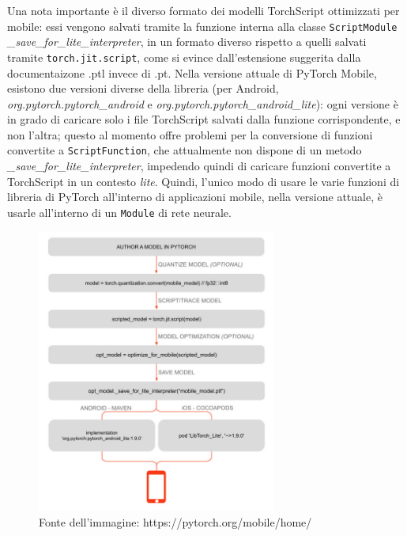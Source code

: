 Una nota importante è il diverso formato dei modelli TorchScript ottimizzati per mobile: 
essi vengono salvati tramite la funzione interna alla classe \texttt{ScriptModule}
\emph{\_save\_for\_lite\_interpreter}, in un formato diverso rispetto a quelli salvati tramite
\texttt{torch.jit.script}, come si evince dall'estensione suggerita dalla documentaizone .ptl
invece di .pt. Nella versione attuale di PyTorch Mobile, esistono due versioni diverse della
libreria (per Android, \emph{org.pytorch.pytorch\_android} e 
\emph{org.pytorch.pytorch\_android\_lite}): ogni versione è in grado di caricare solo i file
TorchScript salvati dalla funzione corrispondente, e non l'altra; questo al momento offre
problemi per la conversione di funzioni convertite a \texttt{ScriptFunction}, che attualmente
non dispone di un metodo \emph{\_save\_for\_lite\_interpreter}, impedendo quindi di caricare 
funzioni convertite a TorchScript in un contesto \emph{lite}. Quindi, l'unico modo di usare
le varie funzioni di libreria di PyTorch all'interno di applicazioni mobile, nella versione 
attuale, è usarle all'interno di un \texttt{Module} di rete neurale.

\begin{figure}[!bh]
    \centering
    \includegraphics[width=0.7\textwidth]{img/pytorch_mobile_workflow.jpg}
    \caption{Fonte dell'immagine: https://pytorch.org/mobile/home/}
    \label{fig:workflow_pytorch_mobile}
\end{figure}

\FloatBarrier

